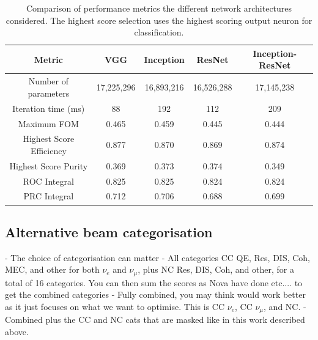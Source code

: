 \begin{table}
    \begin{tabular}{ccccc}
        Metric                   & VGG        & Inception  & ResNet     & Inception-ResNet \\
        \midrule
        Number of parameters     & 17,225,296 & 16,893,216 & 16,526,288 & 17,145,238       \\
        Iteration time (ms)      & 88         & 192        & 112        & 209              \\
        Maximum FOM              & 0.465      & 0.459      & 0.445      & 0.444            \\
        Highest Score Efficiency & 0.877      & 0.870      & 0.869      & 0.874            \\
        Highest Score Purity     & 0.369      & 0.373      & 0.374      & 0.349            \\
        ROC Integral             & 0.825      & 0.825      & 0.824      & 0.824            \\
        PRC Integral             & 0.712      & 0.706      & 0.688      & 0.699            \\
    \end{tabular}
    \caption[Comparison of performance metrics for the different network architectures considered.]
    {Comparison of performance metrics the different network architectures considered. The highest
        score selection uses the highest scoring output neuron for classification.}
    \label{tab:arch}
\end{table}

\subsection{Alternative beam categorisation} %
\label{sec:results_alt_cat} %

- The choice of categorisation can matter
- All categories CC QE, Res, DIS, Coh, MEC, and other for both $\nu_{e}$ and $\nu_{\mu}$, plus NC
Res, DIS, Coh, and other, for a total of 16 categories. You can then sum the scores as Nova have
done etc.... to get the combined categories
- Fully combined, you may think would work better as it just focuses on what we want to optimise.
This is CC $\nu_{e}$, CC $\nu_{\mu}$, and NC.
- Combined plus the CC and NC cats that are masked like in this work described above.

